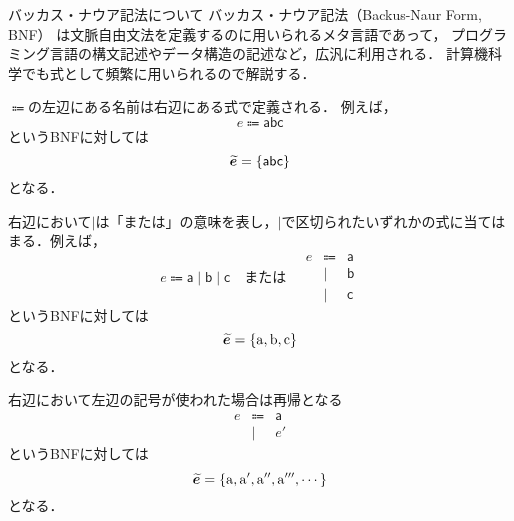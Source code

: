 \documentclass[a4paper,titlepage,report]{jsbook}
\begin{document}
\begin{resbonsiblesection}{バッカス・ナウア記法について}{\sakamoto}\label{sc:about-BNF-form}
バッカス・ナウア記法（Backus-Naur Form, BNF）
は文脈自由文法を定義するのに用いられるメタ言語であって，
プログラミング言語の構文記述やデータ構造の記述など，広汎に利用される．
計算機科学でも式として頻繁に用いられるので解説する．

$\Coloneqq$の左辺にある名前は右辺にある式で定義される．
例えば，
\begin{equation}\label{eq:bnf-example-1} 
e\Coloneqq \mathsf{abc}
\end{equation}
というBNFに対しては
\begin{equation}
\boldsymbol{\widetilde{e}} = \{\mathsf{abc}\}
\end{equation}
となる．

右辺において$\mid$は「または」の意味を表し，$\mid$で区切られたいずれかの式に当てはまる．例えば，
\begin{equation}\label{eq:bnf-example-2} 
e\Coloneqq \mathsf{a} \mid \mathsf{b} \mid \mathsf{c}
\quad\text{または}\quad
\begin{array}{rcl}
    e    &\Coloneqq& \mathsf{a} \\
            &\mid&   \mathsf{b} \\
            &\mid&   \mathsf{c} 
\end{array}
\end{equation}
というBNFに対しては
\begin{equation}
\boldsymbol{\widetilde{e}} = \{\mathrm{a}, \mathrm{b}, \mathrm{c}\}
\end{equation}
となる．

右辺において左辺の記号が使われた場合は再帰となる
\begin{equation}\label{eq:bnf-example-3} 
\begin{array}{rcl}
    e    &\Coloneqq& \mathsf{a} \\
            &\mid&   e\mathsf{'} 
\end{array}
\end{equation}
というBNFに対しては
\begin{equation}
\boldsymbol{\widetilde{e}} = \{\mathrm{a}, \mathrm{a'}, \mathrm{a''}, \mathrm{a'''}, \cdots \}
\end{equation}
となる．
\end{resbonsiblesection}
\end{document}
